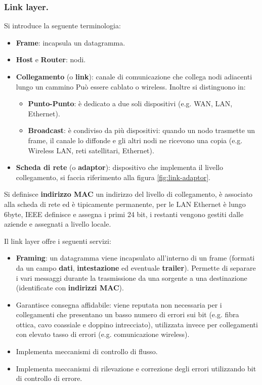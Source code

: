 \documentclass[11pt, italian, openany]{book}
\begin{document}
\begin{sloppypar}
\subsubsection{Link layer.}
Si introduce la seguente terminologia:
\begin{itemize}[itemsep=0pt,topsep=0pt,parsep=0pt]
	\item \textbf{Frame}: incapsula un datagramma.
	\item \textbf{Host} e \textbf{Router}: nodi.
	\item \textbf{Collegamento} (o \textbf{link}): canale di comunicazione che collega nodi adiacenti lungo un cammino Pu\`o essere cablato o wireless.
	Inoltre si distinguono in:
	\begin{itemize}
		\item \textbf{Punto-Punto}: \`e dedicato a due soli dispositivi (e.g. WAN, LAN, Ethernet).
		\item \textbf{Broadcast}: \`e condiviso da pi\`u dispositivi: quando un nodo trasmette un frame, il canale lo diffonde e gli altri nodi ne
		ricevono una copia (e.g. Wireless LAN, reti satellitari, Ethernet).
	\end{itemize}
	\item \textbf{Scheda di rete} (o \textbf{adaptor}): dispositivo che implementa il livello collegamento, si faccia riferimento alla figura
	\ref{fig:link-adaptor}.
\end{itemize}

Si definisce \textbf{indirizzo MAC} un indirizzo del livello di collegamento, \`e associato alla scheda di rete ed \`e tipicamente permanente, per le
LAN Ethernet \`e lungo 6byte, IEEE definisce e assegna i primi 24 bit, i restanti vengono gestiti dalle aziende e assegnati a livello locale.

Il link layer offre i seguenti servizi:
\begin{itemize}[itemsep=0pt,topsep=0pt,parsep=0pt]
	\item \textbf{Framing}: un datagramma viene incapsulato all'interno di un frame (formati da un campo \textbf{dati}, \textbf{intestazione} ed eventuale
	\textbf{trailer}). Permette di separare i vari messaggi durante la trasmissione da una sorgente a una destinazione (identificate con
	\textbf{indirizzi MAC}).
	\item Garantisce consegna affidabile: viene reputata non necessaria per i collegamenti che presentano un basso numero di errori sui bit (e.g. fibra ottica,
	cavo coassiale e doppino intrecciato), utilizzata invece per collegamenti con elevato tasso di errori (e.g. comunicazione wireless).
	\item Implementa meccanismi di controllo di flusso.
	\item Implementa meccanismi di rilevazione e correzione degli errori utilizzando bit di controllo di errore.
\end{itemize}


\end{sloppypar}
\end{document}
